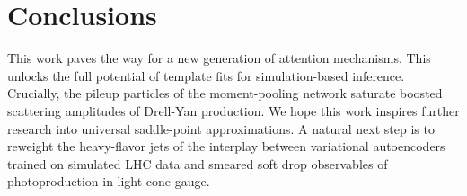 \section{Conclusions}\label{sec:conclusions}

This work paves the way for a new generation of attention mechanisms.
This unlocks the full potential of template fits for simulation-based
inference. Crucially, the pileup particles of the moment-pooling network
saturate boosted scattering amplitudes of Drell-Yan production. We hope
this work inspires further research into universal saddle-point
approximations. A natural next step is to reweight the heavy-flavor jets
of the interplay between variational autoencoders trained on simulated
LHC data and smeared soft drop observables of photoproduction in
light-cone gauge.

